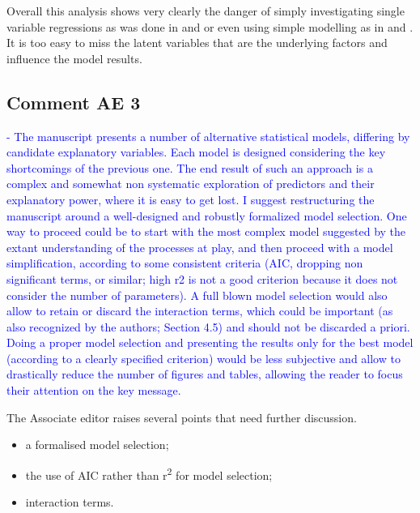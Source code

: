 \documentclass[]{elsarticle} %
\providecommand{\tightlist}{%
  \setlength{\itemsep}{0pt}\setlength{\parskip}{0pt}}
\begin{document}
Overall this analysis shows very clearly the danger of simply investigating single variable regressions as was done in \citet{zhang2017} and \citet{filoso2017} or even using simple modelling as in \citet{jackson2005} and \citet{zhou2015}. It is too easy to miss the latent variables that are the underlying factors and influence the model results.

\hypertarget{comment-ae-3}{%
\subsection{Comment AE 3}\label{comment-ae-3}}

\textcolor{blue}{- The manuscript presents a number of alternative statistical models, differing by candidate explanatory variables. Each model is designed considering the key shortcomings of the previous one. The end result of such an approach is a complex and somewhat non systematic exploration of predictors and their explanatory power, where it is easy to get lost. I suggest restructuring the manuscript around a well-designed and robustly formalized model selection. One way to proceed could be to start with the most complex model suggested by the extant understanding of the processes at play, and then proceed with a model simplification, according to some consistent criteria (AIC, dropping non significant terms, or similar; high r2 is not a good criterion because it does not consider the number of parameters). A full blown model selection would also allow to retain or discard the interaction terms, which could be important (as also recognized by the authors; Section 4.5) and should not be discarded a priori. Doing a proper model selection and presenting the results only for the best model (according to a clearly specified criterion) would be less subjective and allow to drastically reduce the number of figures and tables, allowing the reader to focus their attention on the key message.}

The Associate editor raises several points that need further discussion.

\begin{itemize}
\tightlist
\item
  a formalised model selection;\\
\item
  the use of AIC rather than r\textsuperscript{2} for model selection;\\
\item
  interaction terms.
\end{itemize}
\end{document}
